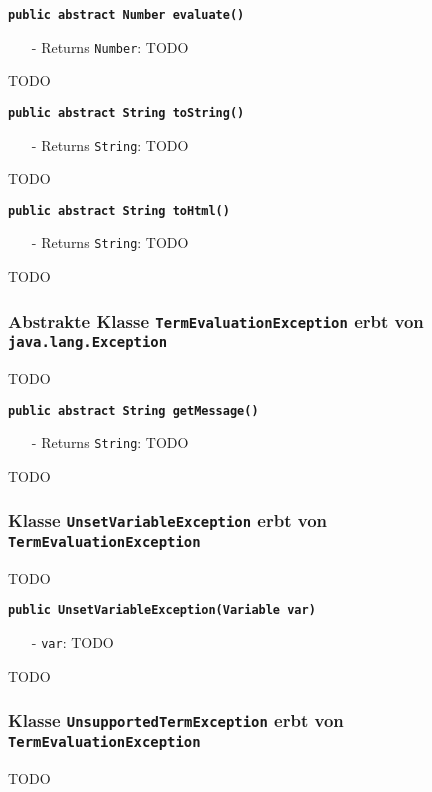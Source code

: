\documentclass[parskip=full,11pt,twoside]{scrartcl}
\begin{document}
\textbf{\texttt{public abstract Number evaluate()}}
\begin{itemize}[noitemsep]
	\item[-] Returns \texttt{Number}: TODO
\end{itemize}
TODO

\textbf{\texttt{public abstract String toString()}}
\begin{itemize}[noitemsep]
	\item[-] Returns \texttt{String}: TODO
\end{itemize}
TODO

\textbf{\texttt{public abstract String toHtml()}}
\begin{itemize}[noitemsep]
	\item[-] Returns \texttt{String}: TODO
\end{itemize}
TODO

\subsubsection{Abstrakte Klasse \texttt{TermEvaluationException} erbt von\\\texttt{java.lang.Exception}}
TODO

\textbf{\texttt{public abstract String getMessage()}}
\begin{itemize}[noitemsep]
	\item[-] Returns \texttt{String}: TODO
\end{itemize}
TODO

\subsubsection{Klasse \texttt{UnsetVariableException} erbt von\\\texttt{TermEvaluationException}}
TODO

\textbf{\texttt{public UnsetVariableException(Variable var)}}
\begin{itemize}[noitemsep]
	\item[-] \texttt{var}: TODO
\end{itemize}
TODO

\subsubsection{Klasse \texttt{UnsupportedTermException} erbt von\\\texttt{TermEvaluationException}}
TODO
\end{document}

